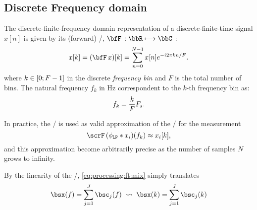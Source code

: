 \subsection{Discrete Frequency domain}
The discrete-finite-frequency domain representation of a discrete-finite-time signal $x[n]$ is given by its (forward) \DFTdef/, $\discreteFT{}:\bbR\kmapsto\bbC$
:
\begin{equation}\label{eq:processing:dft}
    x[k] = (\discreteFT{x})[k] =
    \sum_{n = 0}^{N - 1}
    x[n]
    \cste^{-\csti2\pi k n / F}.
\end{equation}
where $k \in \kintervcc{0}{F - 1}$ in the discrete \textit{frequency bin} and $F$ is the total number of bins.
The natural frequency $f_k$ in $\si{\Hz}$ correspondent to the $k$-th frequency bin as:
\begin{equation}
    f_k = \frac{k}{F}F_s
    .
\end{equation}

In practice, the \DFT/ is used as valid approximation of the \FT/ for the measurement
\begin{equation}
    \fourierTrans{(\lowpassfilter \conv x_i)} (f_k) \approx x_i[k]
    ,
\end{equation}
and this approximation become arbitrarily precise as the number of samples $N$ grows to infinity.

By the linearity of the \DFT/, \cref{eq:processing:ft:mix} simply translates
\begin{equation}\label{eq:processing:ft:mix}
    \mics( f) = \sum_{\idxSrc=1}^{\numSrcs} \imgs_\idxSrc( f)
    \;\leadsto\;
    \mics( k) = \sum_{\idxSrc=1}^{\numSrcs} \imgs_\idxSrc( k)
\end{equation}


